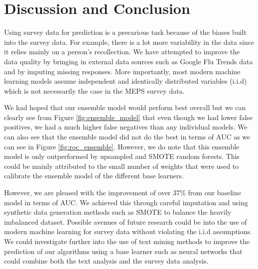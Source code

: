\documentclass[twoside,11pt]{article}
\begin{document}
\section{Discussion and Conclusion}
Using survey data for prediction is a precarious task because of the biases
built into the survey data. For example, there is a lot more variability in the
data since it relies mainly on a person's recollection. We have attempted to
improve the data quality by bringing in external data sources such as Google Flu
Trends data and by imputing missing responses. More importantly, most modern
machine learning models assume independent and identically distributed variables
(i.i.d) which is not necessarily the case in the MEPS survey data.

We had hoped that our ensemble model would perform best overall but we can
clearly see from Figure \ref{fig:ensemble_model} that even though we had lower false
positives, we had a much higher false negatives than any individual models. We
can also see that the ensemble model did not do the best in terms of AUC as we can
see in Figure \ref{fig:roc_ensemble}. However, we do note that this ensemble
model is only outperformed by upsampled and SMOTE random forests.
This could be mainly attributed to the small number of weights that were used to
calibrate the ensemble model of the different base learners. \citep{ensemblingModels}

However, we are pleased with the improvement of over 37\% from our baseline
model in terms of AUC. We achieved this through careful imputation and using
synthetic data generation methods such as SMOTE to balance the heavily
imbalanced dataset. Possible avenues of future research could be into the use of
modern machine learning for survey data without violating the i.i.d assumptions.
We could investigate further into the use of text mining methods to improve the
prediction of our algorithms using a base learner such as neural networks that
could combine both the text analysis and the survey data analysis.


\end{document}
